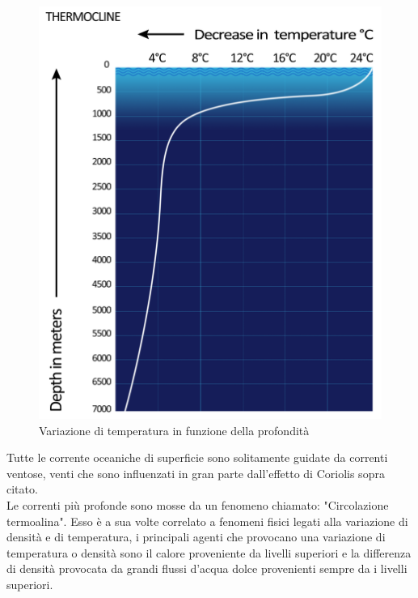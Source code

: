 \begin{figure}[H]
    \centering
    \includegraphics[height=0.4\textwidth]{res/cap2/termoclino.png}
    \caption{Variazione di temperatura in funzione della profondità}
\end{figure}\noindent
Tutte le corrente oceaniche di superficie sono solitamente guidate da correnti ventose, venti che sono influenzati in gran parte dall'effetto di Coriolis sopra citato.\\
Le correnti più profonde sono mosse da un fenomeno chiamato: "Circolazione termoalina".
Esso è a sua volte correlato a fenomeni fisici legati alla variazione di densità e di temperatura, i principali agenti che provocano una variazione di temperatura o densità sono il calore proveniente da livelli superiori e la differenza di densità provocata da grandi flussi d'acqua dolce provenienti sempre da i livelli superiori.\\

